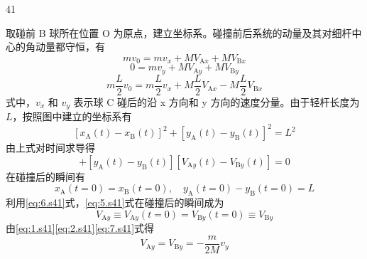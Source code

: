 \begin{solution}{41}
    \begin{subsolution}
        取碰前 B 球所在位置 O 为原点，建立坐标系。碰撞前后系统的动量及其对细杆中心的角动量都守恒，有
        \begin{equation}
            m v_{0} = m v_{x} + M V_{\mathrm{A}x} + M V_{\mathrm{B}x}
            \label{eq:1.s41}
        \end{equation}
        \begin{equation}
            0 = m v_{y} + M V_{\mathrm{A}y} + M V_{\mathrm{B}y}
            \label{eq:2.s41}
        \end{equation}
        \begin{equation}
            m \frac{L}{2} v_{0} = m \frac{L}{2} v_{x} + M \frac{L}{2} V_{\mathrm{A}x} - M \frac{L}{2} V_{\mathrm{B}x}
            \label{eq:3.s41}
        \end{equation}
        式中，$v_{x}$ 和 $v_{y}$ 表示球 C 碰后的沿 x 方向和 y 方向的速度分量。由于轻杆长度为 $L$，按照图中建立的坐标系有
        \begin{equation}
            \left[x_{\mathrm{A}}(t) - x_{\mathrm{B}}(t)\right]^{2} + \left[y_{\mathrm{A}}(t) - y_{\mathrm{B}}(t)\right]^{2} = L^{2}
            \label{eq:4.s41}
        \end{equation}
        由上式对时间求导得
        \begin{equation}
            [x_{\mathrm{A}}(t) - x_{\mathrm{B}}(t)][V_{\mathrm{A}x}(t) - V_{\mathrm{B}x}(t)] + [y_{\mathrm{A}}(t) - y_{\mathrm{B}}(t)][V_{\mathrm{A}y}(t) - V_{\mathrm{B}y}(t)] = 0
            \label{eq:5.s41}
        \end{equation}
        在碰撞后的瞬间有
        \begin{equation}
            x_{\mathrm{A}}(t = 0) = x_{\mathrm{B}}(t = 0),\quad y_{\mathrm{A}}(t = 0) - y_{\mathrm{B}}(t = 0) = L
            \label{eq:6.s41}
        \end{equation}
        利用\eqref{eq:6.s41}式，\eqref{eq:5.s41}式在碰撞后的瞬间成为
        \begin{equation}
            V_{\mathrm{A}y} \equiv V_{\mathrm{A}y}(t = 0) = V_{\mathrm{B}y}(t = 0) \equiv V_{\mathrm{B}y}
            \label{eq:7.s41}
        \end{equation}
        由\eqref{eq:1.s41}\eqref{eq:2.s41}\eqref{eq:7.s41}式得
        \begin{equation}
            V_{\mathrm{A}y} = V_{\mathrm{B}y} = -\frac{m}{2M} v_{y}
            \label{eq:8.s41}
        \end{equation}

\end{subsolution}
\end{solution}
